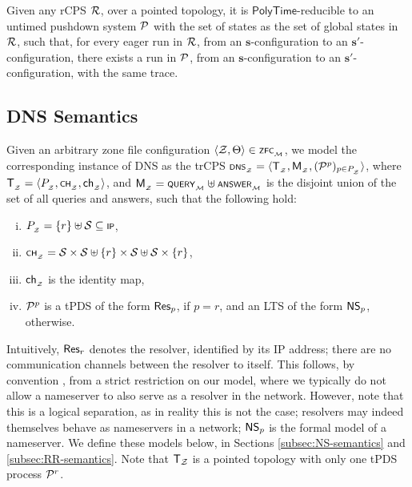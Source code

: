 \begin{lemma}\label{lem:rcps-to-pds}
	Given any rCPS $\cal R$, over a pointed topology, it is $\mathsf{PolyTime}$-reducible to an untimed pushdown system $\cal P$ with the set of states as the set of global states in $\cal R$, such that, for every eager run in $\cal R$, from an $\mathbf{s}$-configuration to an $\mathbf{s}'$-configuration, there exists a run in $\cal P$, from an $\mathbf{s}$-configuration to an $\mathbf{s}'$-configuration, with the same trace.
\end{lemma}

\subsection{DNS Semantics}\label{subsec:dns-semantics}

Given an arbitrary zone file configuration $\tup{\cal Z ,\Theta} \in \scrsf{zfc}\subsub{\monoid}$, we model the corresponding instance of DNS as the trCPS $\scrsf{dns}\subsub{\cal Z}=\tup{\mathsf T\subsub{\cal Z},\mathsf M\subsub{\cal Z}, (\cal P^p)_{p\in P\subsub{\cal Z}}}$, where $\mathsf T\subsub{\cal Z} = \tup{P\subsub{\cal Z}, \scrsf{ch}\subsub{\cal Z}, \ch\subsub{\cal Z}}$, and $\mathsf M\subsub{\cal Z} = \scrsf{query}\subsub{\monoid}\uplus\scrsf{answer}\subsub{\monoid}$ is the disjoint union of the set of all queries and answers, such that the following hold:
\begin{enumerate}[(i)]
	\item $P\subsub{\cal Z} = \{ r \} \uplus \cal S \subseteq \scrsf{ip}$,
	\item $\scrsf{ch}\subsub{\cal Z} = \cal S \times \cal S \uplus \{ r \} \times \cal S \uplus \cal S \times \{ r \}$,
	\item $\ch\subsub{\cal Z}$ is the identity map,
	\item $\cal P^p$ is a tPDS of the form $\rec{p}$, if $p = r$, and an LTS of the form $\ns{p}$, otherwise.
\end{enumerate}

Intuitively, $\rec{r}$ denotes the resolver, identified by its IP address; there are no communication channels between the resolver to itself. This follows, by convention \cite{groot,dnsmaude}, from a strict restriction on our model, where we typically do not allow a nameserver to also serve as a resolver in the network. However, note that this is a logical separation, as in reality this is not the case; resolvers may indeed themselves behave as nameservers \cite{rfc1034,rfc1035} in a network; $\ns{p}$ is the formal model of a nameserver. We define these models below, in Sections \ref{subsec:NS-semantics} and \ref{subsec:RR-semantics}. Note that $\mathsf T_{\cal Z}$ is a pointed topology with only one tPDS process $\cal P^r$. 

